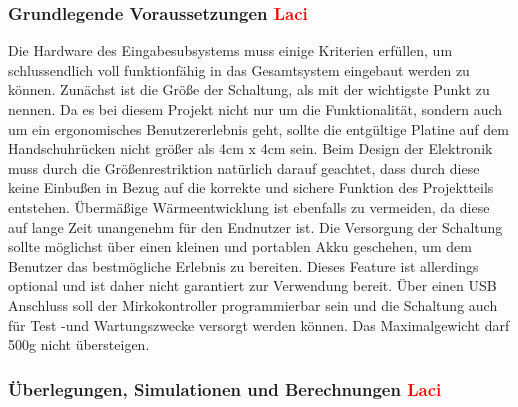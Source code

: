 \documentclass[titlepage,12pt,twoside]{article}
\begin{document}
\subsubsection{Grundlegende Voraussetzungen \textcolor{red}{Laci}}
Die Hardware des Eingabesubsystems muss einige Kriterien erfüllen, um schlussendlich voll funktionfähig in das Gesamtsystem eingebaut 
werden zu können. Zunächst ist die Größe der Schaltung, als mit der wichtigste Punkt zu nennen. Da es bei diesem Projekt nicht nur
um die Funktionalität, sondern auch um ein ergonomisches Benutzererlebnis geht, sollte die entgültige Platine auf dem Handschuhrücken
nicht größer als 4cm x 4cm sein. Beim Design der Elektronik muss durch die Größenrestriktion natürlich darauf geachtet, dass durch
diese keine Einbußen in Bezug auf die korrekte und sichere Funktion des Projektteils entstehen. Übermäßige Wärmeentwicklung ist 
ebenfalls zu vermeiden, da diese auf lange Zeit unangenehm für den Endnutzer ist. Die Versorgung der Schaltung
sollte möglichst über einen kleinen und portablen Akku geschehen, um dem Benutzer das bestmögliche Erlebnis zu bereiten. Dieses Feature ist
allerdings optional und ist daher nicht garantiert zur Verwendung bereit. Über einen USB Anschluss soll der Mirkokontroller programmierbar sein und die Schaltung
auch für Test -und Wartungszwecke versorgt werden können. Das Maximalgewicht darf 500g nicht übersteigen. \\

\subsubsection{Überlegungen, Simulationen und Berechnungen \textcolor{red}{Laci}}
\label{chap:Überlegungen, Simulationen und Berechnungen}
\end{document}
